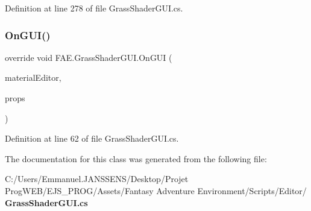 Definition at line 278 of file Grass\+Shader\+G\+U\+I.\+cs.

\mbox{\label{class_f_a_e_1_1_grass_shader_g_u_i_a40af2841b6886d7e70701744020b175a}} 
\subsubsection{On\+G\+U\+I()}
{\footnotesize\ttfamily override void F\+A\+E.\+Grass\+Shader\+G\+U\+I.\+On\+G\+UI (\begin{DoxyParamCaption}\item[{Material\+Editor}]{material\+Editor,  }\item[{Material\+Property [$\,$]}]{props }\end{DoxyParamCaption})}



Definition at line 62 of file Grass\+Shader\+G\+U\+I.\+cs.



The documentation for this class was generated from the following file\+:\begin{DoxyCompactItemize}
\item 
C\+:/\+Users/\+Emmanuel.\+J\+A\+N\+S\+S\+E\+N\+S/\+Desktop/\+Projet Prog\+W\+E\+B/\+E\+J\+S\+\_\+\+P\+R\+O\+G/\+Assets/\+Fantasy Adventure Environment/\+Scripts/\+Editor/\textbf{ Grass\+Shader\+G\+U\+I.\+cs}\end{DoxyCompactItemize}
